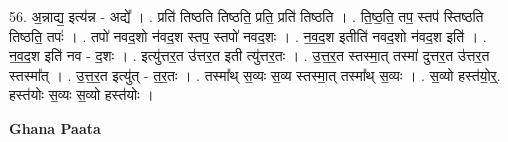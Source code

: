 \documentclass[17pt]{extarticle}
\begin{document}
56. अ॒न्नाद्य॒ इत्य॑न्न - अद्ये᳚ । . प्रति॑ तिष्ठति तिष्ठति॒ प्रति॒ प्रति॑ तिष्ठति । . ति॒ष्ठ॒ति॒ तप॒ स्तप॑ स्तिष्ठति तिष्ठति॒ तपः॑ । . तपो॑ नवद॒शो न॑वद॒श स्तप॒ स्तपो॑ नवद॒शः । . न॒व॒द॒श इतीति॑ नवद॒शो न॑वद॒श इति॑ । . न॒व॒द॒श इति॑ नव - द॒शः । . इत्यु॑त्तर॒त उ॑त्तर॒त इती त्यु॑त्तर॒तः । . उ॒त्त॒र॒त स्तस्मा॒त् तस्मा॑ दुत्तर॒त उ॑त्तर॒त स्तस्मा᳚त् । . उ॒त्त॒र॒त इत्यु॑त् - त॒र॒तः । . तस्मा᳚थ् स॒व्यः स॒व्य स्तस्मा॒त् तस्मा᳚थ् स॒व्यः । . स॒व्यो हस्त॑यो॒र्॒. हस्त॑योः स॒व्यः स॒व्यो हस्त॑योः । \newline

\textbf{Ghana Paata } \newline
\end{document}
